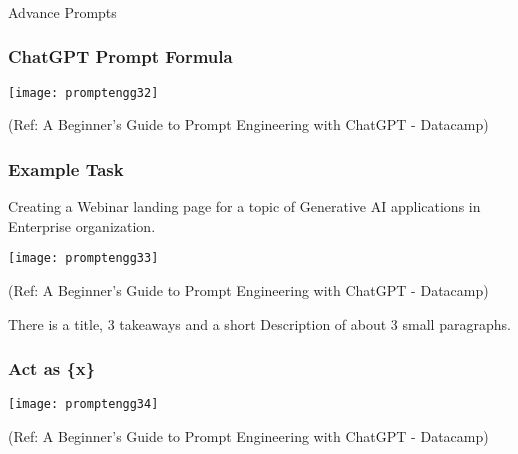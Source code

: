 
\begin{frame}[fragile]\frametitle{}
\begin{center}
{\Large Advance Prompts}
\end{center}
\end{frame}

\begin{frame}[fragile]\frametitle{ChatGPT Prompt Formula}

\begin{center}
\texttt{[image: promptengg32]}

{\tiny (Ref: A Beginner's Guide to Prompt Engineering with ChatGPT - Datacamp)}

\end{center}		
		

\end{frame}

\begin{frame}[fragile]\frametitle{Example Task}

Creating a Webinar landing page for a topic of Generative AI applications in Enterprise organization.

\begin{center}
\texttt{[image: promptengg33]}

{\tiny (Ref: A Beginner's Guide to Prompt Engineering with ChatGPT - Datacamp)}

\end{center}		
		
There is a title, 3 takeaways and a short Description of about 3 small paragraphs.

\end{frame}

\begin{frame}[fragile]\frametitle{Act as \{x\}}


\begin{center}
\texttt{[image: promptengg34]}

{\tiny (Ref: A Beginner's Guide to Prompt Engineering with ChatGPT - Datacamp)}
\end{center}		
		

\end{frame}

